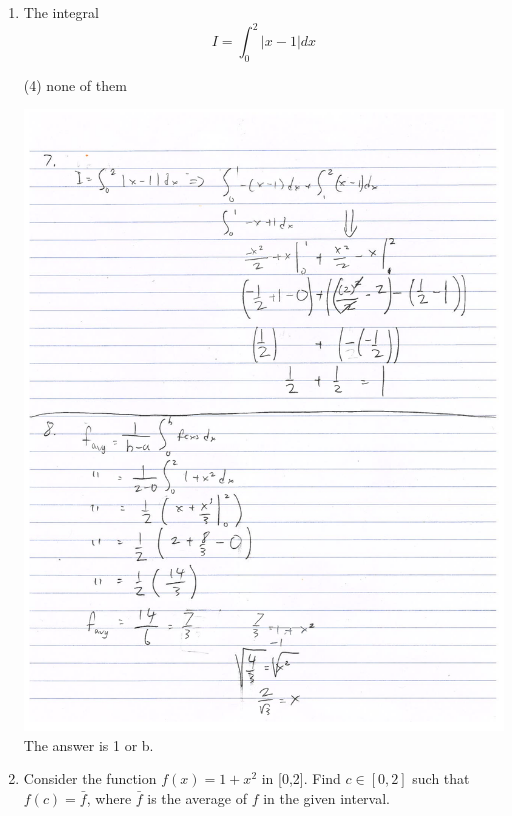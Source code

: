 \documentclass[MATH-115-Notes.tex]{subfiles}
\begin{document}
\begin{enumerate}[itemsep=5mm]
        {\centering {}\\}   
        \item The integral \[I = \int_{0}^{2}|x - 1|dx\]
        \begin{tasks}(4)
            \task none of them    
        \end{tasks}
        {\centering\includegraphics[trim={0 60cm 0 0},clip,scale=0.15]{./figures/output-1.png}\\}
        The answer is 1 or b.
        \item Consider the function $f(x) = 1 + x^2$ in [0,2]. Find $c\in[0,2]$ such that $f(c) = \bar{f}$, where $\bar{f}$ is the average of $f$ in the given interval.

\end{enumerate}
\end{document}
